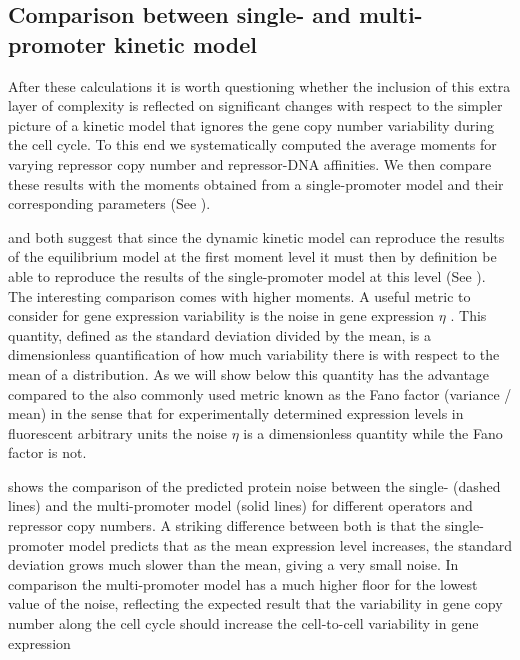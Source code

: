 \subsection{Comparison between single- and multi-promoter kinetic model}

After these calculations it is worth questioning whether the inclusion of this
extra layer of complexity is reflected on significant changes with respect to
the simpler picture of a kinetic model that ignores the gene copy number
variability during the cell cycle. To this end we systematically computed the
average moments for varying repressor copy number and repressor-DNA affinities.
We then compare these results with the moments obtained from a single-promoter
model and their corresponding parameters (See ).

 and  both suggest that since
the dynamic kinetic model can reproduce the results of the equilibrium model at
the first moment level it must then by definition be able to reproduce the
results of the single-promoter model at this level (See ). The interesting comparison comes with higher moments. A useful metric
to consider for gene expression variability is the noise in gene expression
$\eta$ \cite{Shahrezaei2008}. This  quantity, defined as the standard deviation
divided by the mean, is a dimensionless quantification of how much variability
there is with respect to the mean of a distribution. As we will show below this
quantity has the advantage compared to the also commonly used metric known as
the Fano factor (variance / mean) in the sense that for experimentally
determined expression levels in fluorescent arbitrary units the noise $\eta$ is
a dimensionless quantity while the Fano factor is not.

 shows the comparison of the predicted protein noise
between  the single- (dashed lines) and the multi-promoter model (solid lines)
for different operators and repressor copy numbers. A striking difference
between both is that the single-promoter model predicts that as the mean
expression  level increases, the standard deviation grows much slower than the
mean, giving a very small noise. In comparison the multi-promoter model has a
much higher floor for the lowest value of the noise, reflecting the expected
result that the variability in gene copy number along the cell cycle should
increase the cell-to-cell variability in gene expression \cite{Peterson2015,
Jones2014a}

